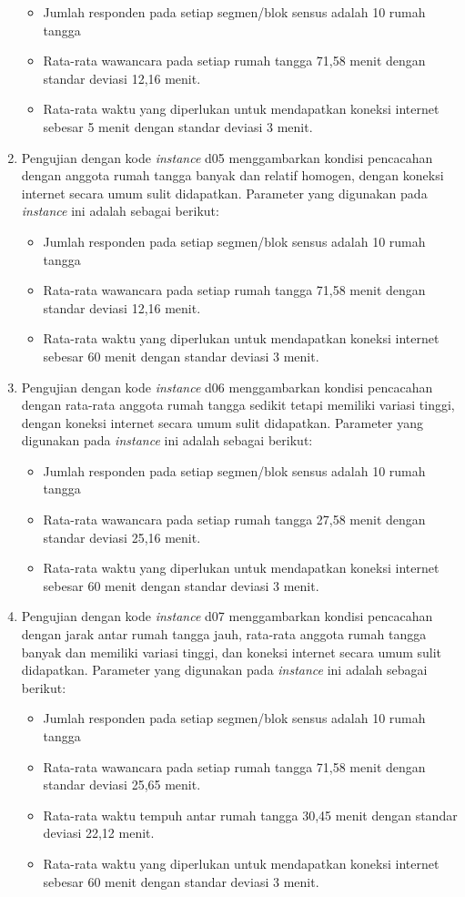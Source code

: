 \begin{enumerate}
	\begin{itemize}
		\item Jumlah responden pada setiap segmen/blok sensus adalah 10 rumah tangga
		\item Rata-rata wawancara pada setiap rumah tangga 71,58 menit dengan standar deviasi 12,16 menit.
		\item Rata-rata waktu yang diperlukan untuk mendapatkan koneksi internet sebesar 5 menit dengan standar deviasi 3 menit.
	\end{itemize}
	\item Pengujian dengan kode \textit{instance} d05 menggambarkan kondisi pencacahan dengan anggota rumah tangga banyak dan relatif homogen, dengan koneksi internet secara umum sulit didapatkan. Parameter yang digunakan pada \textit{instance} ini adalah sebagai berikut:
	\begin{itemize}
		\item Jumlah responden pada setiap segmen/blok sensus adalah 10 rumah tangga
		\item Rata-rata wawancara pada setiap rumah tangga 71,58 menit dengan standar deviasi 12,16 menit.
		\item Rata-rata waktu yang diperlukan untuk mendapatkan koneksi internet sebesar 60 menit dengan standar deviasi 3 menit.
	\end{itemize}
	\item Pengujian dengan kode \textit{instance} d06 menggambarkan kondisi pencacahan dengan rata-rata anggota rumah tangga sedikit tetapi memiliki variasi tinggi, dengan koneksi internet secara umum sulit didapatkan. Parameter yang digunakan pada \textit{instance} ini adalah sebagai berikut:
	\begin{itemize}
		\item Jumlah responden pada setiap segmen/blok sensus adalah 10 rumah tangga
		\item Rata-rata wawancara pada setiap rumah tangga 27,58 menit dengan standar deviasi 25,16 menit.
		\item Rata-rata waktu yang diperlukan untuk mendapatkan koneksi internet sebesar 60 menit dengan standar deviasi 3 menit.
	\end{itemize}
	\item Pengujian dengan kode \textit{instance} d07 menggambarkan kondisi pencacahan dengan jarak antar rumah tangga jauh, rata-rata anggota rumah tangga banyak dan memiliki variasi tinggi, dan koneksi internet secara umum sulit didapatkan. Parameter yang digunakan pada \textit{instance} ini adalah sebagai berikut:
	\begin{itemize}
		\item Jumlah responden pada setiap segmen/blok sensus adalah 10 rumah tangga
		\item Rata-rata wawancara pada setiap rumah tangga 71,58 menit dengan standar deviasi 25,65 menit.
		\item Rata-rata waktu tempuh antar rumah tangga 30,45 menit dengan standar deviasi 22,12 menit.
		\item Rata-rata waktu yang diperlukan untuk mendapatkan koneksi internet sebesar 60 menit dengan standar deviasi 3 menit.
	\end{itemize}
\end{enumerate}


